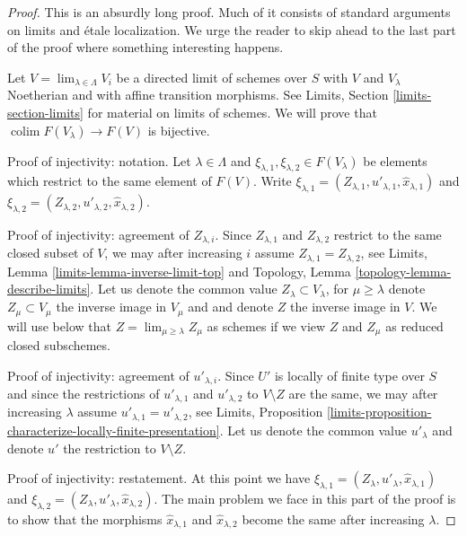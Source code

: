 \documentclass[10pt,a4paper]{amsart}
\theoremstyle{plain}
\theoremstyle{definition}
\theoremstyle{remark}
\numberwithin{equation}{subsection}
\def\lim{\mathop{\mathrm{lim}}\nolimits}
\def\colim{\mathop{\mathrm{colim}}\nolimits}
\begin{document}
\begin{proof}
This is an absurdly long proof. Much of it consists of standard
arguments on limits and \'etale localization. We urge the reader to skip ahead
to the last part of the proof where something interesting happens.

\medskip\noindent
Let $V = \lim_{\lambda \in \Lambda} V_i$ be a directed limit of schemes
over $S$ with $V$ and $V_\lambda$ Noetherian and with affine transition
morphisms. See Limits, Section \ref{limits-section-limits} for material on
limits of schemes. We will prove that $\colim F(V_\lambda) \to F(V)$
is bijective.

\medskip\noindent
Proof of injectivity: notation.
Let $\lambda \in \Lambda$ and
$\xi_{\lambda, 1}, \xi_{\lambda, 2} \in F(V_\lambda)$ 
be elements which restrict to the same element of $F(V)$.
Write $\xi_{\lambda, 1} = (Z_{\lambda, 1}, u'_{\lambda, 1},
\hat x_{\lambda, 1})$ and
$\xi_{\lambda, 2} = (Z_{\lambda, 2}, u'_{\lambda, 2}, \hat x_{\lambda, 2})$.

\medskip\noindent
Proof of injectivity: agreement of $Z_{\lambda, i}$.
Since $Z_{\lambda, 1}$ and $Z_{\lambda, 2}$ restrict to the same closed
subset of $V$, we may after increasing $i$ assume
$Z_{\lambda, 1} = Z_{\lambda, 2}$, see
Limits, Lemma \ref{limits-lemma-inverse-limit-top} and
Topology, Lemma \ref{topology-lemma-describe-limits}.
Let us denote the common value $Z_\lambda \subset V_\lambda$, for
$\mu \geq \lambda$
denote $Z_\mu \subset V_\mu$ the inverse image in $V_\mu$ and
and denote $Z$ the inverse image in $V$. We will use below that
$Z = \lim_{\mu \geq \lambda} Z_\mu$ as schemes if we view $Z$
and $Z_\mu$ as reduced closed subschemes.

\medskip\noindent
Proof of injectivity: agreement of $u'_{\lambda, i}$.
Since $U'$ is locally of finite type over $S$ and since
the restrictions of $u'_{\lambda, 1}$ and $u'_{\lambda, 2}$
to $V \setminus Z$ are the same, we may after increasing $\lambda$ assume
$u'_{\lambda, 1} = u'_{\lambda, 2}$, see Limits, Proposition
\ref{limits-proposition-characterize-locally-finite-presentation}.
Let us denote the common value $u'_\lambda$ and denote
$u'$ the restriction to $V \setminus Z$.

\medskip\noindent
Proof of injectivity: restatement.
At this point we have
$\xi_{\lambda, 1} = (Z_\lambda, u'_\lambda, \hat x_{\lambda, 1})$ and
$\xi_{\lambda, 2} = (Z_\lambda, u'_\lambda, \hat x_{\lambda, 2})$.
The main problem we face in this part of the proof
is to show that the morphisms
$\hat x_{\lambda, 1}$ and $\hat x_{\lambda, 2}$ become the same after
increasing $\lambda$.


\end{proof}
\end{document}
